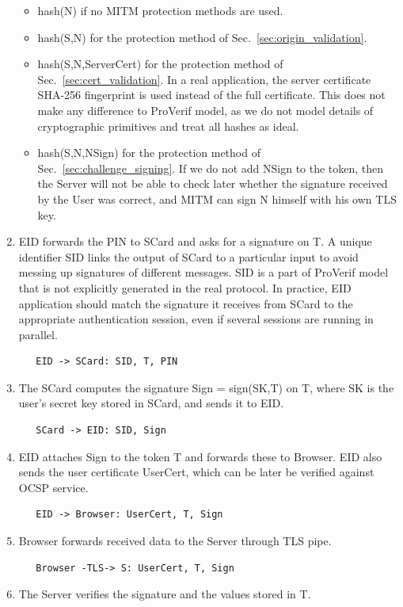 \begin{enumerate}
\begin{itemize}
\item hash(N) if no MITM protection methods are used.
\item hash(S,N) for the protection method of Sec.~\ref{sec:origin_validation}.
\item hash(S,N,ServerCert) for the protection method of Sec.~\ref{sec:cert_validation}. In a real application, the server certificate SHA-256 fingerprint is used instead of the full certificate. This does not make any difference to ProVerif model, as we do not model details of cryptographic primitives and treat all hashes as ideal.
\item hash(S,N,NSign) for the protection method of Sec.~\ref{sec:challenge_signing}. If we do not add NSign to the token, then the Server will not be able to check later whether the signature received by the User was correct, and MITM can sign N himself with his own TLS key.
\end{itemize}


\item\label{item:auth:step10} EID forwards the PIN to SCard and asks for a signature on T. A unique identifier SID links the output of SCard to a particular input to avoid messing up signatures of different messages. SID is a part of ProVerif model that is not explicitly generated in the real protocol. In practice, EID application should match the signature it receives from SCard to the appropriate authentication session,  even if several sessions are running in parallel.
\begin{verbatim}
   EID -> SCard: SID, T, PIN
\end{verbatim}
\item\label{item:auth:step11} The SCard computes the signature Sign = sign(SK,T) on T, where SK is the user's secret key stored in SCard, and sends it to EID.
\begin{verbatim}
   SCard -> EID: SID, Sign
\end{verbatim}
\item\label{item:auth:step12} EID attaches Sign to the token T and forwards these to Browser. EID also sends the user certificate UserCert, which can be later be verified against OCSP service.
\begin{verbatim}
   EID -> Browser: UserCert, T, Sign
\end{verbatim}
\item\label{item:auth:step13} Browser forwards received data to the Server through TLS pipe.
\begin{verbatim}
   Browser -TLS-> S: UserCert, T, Sign
\end{verbatim}
\item\label{item:auth:step14} The Server verifies the signature and the values stored in T.


\end{enumerate}
